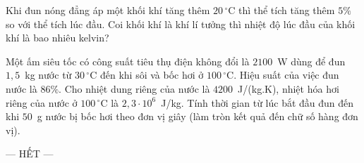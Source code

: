 	\begin{ex}%
		Khi đun nóng đẳng áp một khối khí tăng thêm $20\,^\circ\text{C}$ thì thể tích tăng thêm $5\%$ so với thể tích lúc đầu. Coi khối khí là khí lí tưởng thì nhiệt độ lúc đầu của khối khí là bao nhiêu kelvin?
		\par
	\end{ex}

	\begin{ex}%
		Một ấm siêu tốc có công suất tiêu thụ điện không đổi là $2100$~W dùng để đun $1{,}5$~kg nước từ $30\,^\circ\text{C}$ đến khi sôi và bốc hơi ở $100\,^\circ\text{C}$. Hiệu suất của việc đun nước là $86\%$. Cho nhiệt dung riêng của nước là $4200$~J/(kg.K), nhiệt hóa hơi riêng của nước ở $100\,^\circ\text{C}$ là $2{,}3\cdot 10^6$~J/kg. Tính thời gian từ lúc bắt đầu đun đến khi $50$~g nước bị bốc hơi theo đơn vị giây (làm tròn kết quả đến chữ số hàng đơn vị).
		\par
	\end{ex}

	\centerline{--- HẾT ---}


